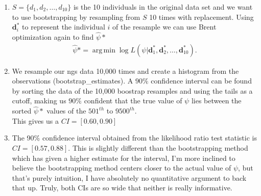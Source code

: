 \documentclass[12pt]{article}
\numberwithin{theorem}{subsection}
\theoremstyle{definition}
\numberwithin{definition}{subsection}
\numberwithin{corollary}{subsection}
\theoremstyle{remark}
\begin{document}
\begin{enumerate}[label=\textbf{\arabic*.}, start=6]
\begin{enumerate}[label = \textbf{\alph*.}]
        \end{enumerate}
    \newpage
    \item $S = \{d_1, d_2, \dots, d_{10}\}$ is the 10 individuals in the original data set and we want to use bootstrapping by resampling from $S$ 10 times with replacement. Using $\bm{d}_i^*$ to represent the individual $i$ of the resample we can use Brent optimization again to find $\hat{\psi}*$
        \begin{align*}
                \hat{\psi}* = \operatorname{arg\,min}\log{L(\psi | \bm{d}_1^*, \bm{d}_2^*, \dots, \bm{d}_{10}^*)}.
        \end{align*}
    \item We resample our ngs data 10,000 times and create a histogram from the observations (bootstrap\_estimates). A $90\%$ confidence interval can be found by sorting the data of the 10,000 boostrap resamples and using the tails as a cutoff, making us $90\%$ confident that the true value of $\psi$ lies between the sorted $\hat{\psi}*$ values of the $501^{th}$ to $9500^{th}$.\\
    This gives us a $CI = [0.60, 0.90]$
    \item The 90\% confidence interval obtained from the likelihood ratio test statistic is $CI = [0.57, 0.88]$. This is slightly different than the bootstrapping method which has given a higher estimate for the interval, I'm more inclined to believe the bootstrapping method centers closer to the actual value of $\psi$, but that's purely intuition, I have absolutely no quantitative argument to back that up. Truly, both CIs are so wide that neither is really informative.
\end{enumerate}

\printbibliography
\end{document}
